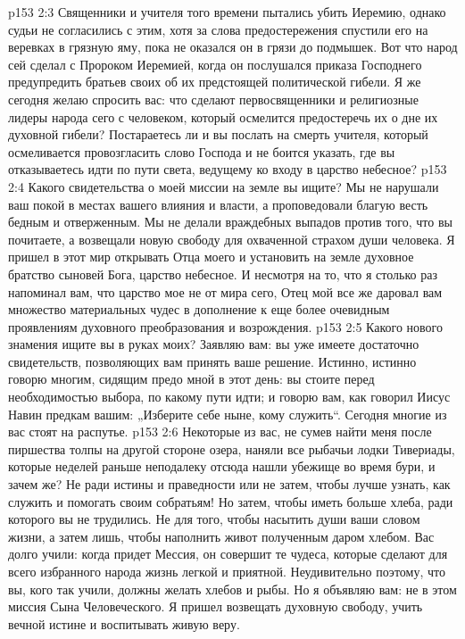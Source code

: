 \vs p153 2:3 Священники и учителя того времени пытались убить Иеремию, однако судьи не согласились с этим, хотя за слова предостережения спустили его на веревках в грязную яму, пока не оказался он в грязи до подмышек. Вот что народ сей сделал с Пророком Иеремией, когда он послушался приказа Господнего предупредить братьев своих об их предстоящей политической гибели. Я же сегодня желаю спросить вас: что сделают первосвященники и религиозные лидеры народа сего с человеком, который осмелится предостеречь их о дне их духовной гибели? Постараетесь ли и вы послать на смерть учителя, который осмеливается провозгласить слово Господа и не боится указать, где вы отказываетесь идти по пути света, ведущему ко входу в царство небесное?
\vs p153 2:4 Какого свидетельства о моей миссии на земле вы ищите? Мы не нарушали ваш покой в местах вашего влияния и власти, а проповедовали благую весть бедным и отверженным. Мы не делали враждебных выпадов против того, что вы почитаете, а возвещали новую свободу для охваченной страхом души человека. Я пришел в этот мир открывать Отца моего и установить на земле духовное братство сыновей Бога, царство небесное. И несмотря на то, что я столько раз напоминал вам, что царство мое не от мира сего, Отец мой все же даровал вам множество материальных чудес в дополнение к еще более очевидным проявлениям духовного преобразования и возрождения.
\vs p153 2:5 Какого нового знамения ищите вы в руках моих? Заявляю вам: вы уже имеете достаточно свидетельств, позволяющих вам принять ваше решение. Истинно, истинно говорю многим, сидящим предо мной в этот день: вы стоите перед необходимостью выбора, по какому пути идти; и говорю вам, как говорил Иисус Навин предкам вашим: „Изберите себе ныне, кому служить“. Сегодня многие из вас стоят на распутье.
\vs p153 2:6 Некоторые из вас, не сумев найти меня после пиршества толпы на другой стороне озера, наняли все рыбачьи лодки Тивериады, которые неделей раньше неподалеку отсюда нашли убежище во время бури, и зачем же? Не ради истины и праведности или не затем, чтобы лучше узнать, как служить и помогать своим собратьям! Но затем, чтобы иметь больше хлеба, ради которого вы не трудились. Не для того, чтобы насытить души ваши словом жизни, а затем лишь, чтобы наполнить живот полученным даром хлебом. Вас долго учили: когда придет Мессия, он совершит те чудеса, которые сделают для всего избранного народа жизнь легкой и приятной. Неудивительно поэтому, что вы, кого так учили, должны желать хлебов и рыбы. Но я объявляю вам: не в этом миссия Сына Человеческого. Я пришел возвещать духовную свободу, учить вечной истине и воспитывать живую веру.
